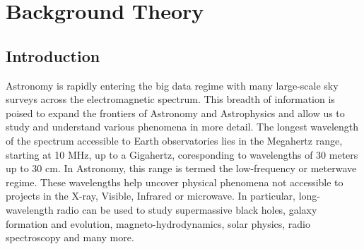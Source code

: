 \chapter{Background Theory}

\label{ch:background}

\section{Introduction}

Astronomy is rapidly entering the big data regime with many large-scale sky surveys across the electromagnetic spectrum. This breadth of information is poised to expand the frontiers of Astronomy and Astrophysics and allow us to study and understand various phenomena in more detail. The longest wavelength of the spectrum accessible to Earth observatories lies in the Megahertz range, starting at 10 MHz, up to a Gigahertz, coresponding to wavelengths of 30 meters up to 30 cm. In Astronomy, this range is termed the low-frequency or meterwave regime. These wavelengths help uncover physical phenomena not accessible to projects in the X-ray, Visible, Infrared or microwave. In particular, long-wavelength radio can be used to study supermassive black holes, galaxy formation and evolution, magneto-hydrodynamics, solar physics, radio spectroscopy and many more. 


